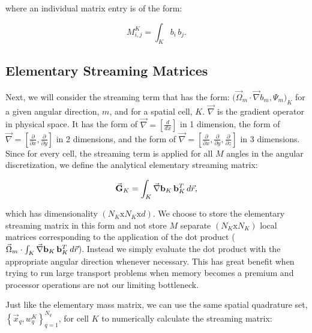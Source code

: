 \noindent where an individual matrix entry is of the form:

\begin{equation}
\label{eq::Sn_mass_matrix_entry}
M_{i,j}^K =  \int_K b_i \, b_j .
\end{equation}

\subsection{Elementary Streaming Matrices}
\label{sec::Sn_Spatial_Streaming}

Next, we will consider the streaming term that has the form: $ \Big( \vec{\Omega}_m \cdot \vec{\nabla}  b_m , \Psi_m  \Big)_K$ for a given angular direction, $m$, and for a spatial cell, $K$. $\vec{\nabla} $ is the gradient operator in physical space. It has the form of $\vec{\nabla} = \left[ \frac{d}{dx} \right]$ in 1 dimension, the form of $\vec{\nabla} = \left[ \frac{\partial}{\partial x} , \frac{\partial}{\partial y} \right]$ in 2 dimensions, and the form of $\vec{\nabla} = \left[ \frac{\partial}{\partial x} , \frac{\partial}{\partial y} , \frac{\partial}{\partial z} \right]$ in 3 dimensions. Since for every cell, the streaming term is applied for all $M$ angles in the angular discretization, we define the analytical elementary streaming matrix:

\begin{equation}
\label{eq::Sn_streaming_matrix_analytical}
\vec{{\bf G}}_K =    \int_K \vec{\nabla} {\bf b}_K \, {\bf b}_K^T \, d {\vec{r}} ,
\end{equation}

\noindent which has dimensionality $(N_K \text{x} N_K \text{x} d)$. We choose to store the elementary streaming matrix in this form and not store $M$ separate $(N_K \text{x} N_K)$ local matrices corresponding to the application of the dot product ($ \vec{\Omega}_m  \cdot \int_K  \vec{\nabla} {\bf b}_K \, {\bf b}_K^T \, d {\vec{r}}$). Instead we simply evaluate the dot product with the appropriate angular direction whenever necessary. This has great benefit when trying to run large transport problems when memory becomes a premium and processor operations are not our limiting bottleneck. 

Just like the elementary mass matrix, we can use the same spatial quadrature set, $\left\{  \vec{x}_q , w_q^{K}  \right\}_{q=1}^{N_q}$, for cell $K$ to numerically calculate the streaming matrix:


